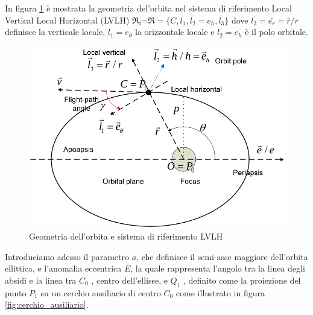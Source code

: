 In figura \ref{fig:LVLH} è mostrata la
geometria del'orbita nel sistema di riferimento Local Vertical Local Horizontal (LVLH)
$\mathfrak{R_l}$=$\mathfrak{R}=\{C,\bar{l_1},\bar{l_2}=e_h,\bar{l_3}\}$ dove
$\bar{l_3}=\bar{e_r}=\bar{r}/r$ definisce la verticale locale, $l_1=e_{\theta}$
la orizzontale locale e $l_2=e_h$ è il polo orbitale.


\begin{figure}[htp]
\begin{center}
  \includegraphics[width=\textwidth]{modelling/orbit_dynamics/image/LVLH.png}
  \caption{Geometria dell'orbita e sistema di riferimento LVLH}
  \label{fig:LVLH}
\end{center}
\end{figure}


Introduciamo adesso il parametro $a$, che definisce il semi-asse maggiore
dell'orbita ellittica, e l'anomalia eccentrica $E$, la quale rappresenta
l'angolo tra la linea degli absidi e la linea tra $C_0$ , centro dell’ellisse, e $Q_1$ ,
definito come la proiezione del punto $P_1$ su un cerchio ausiliario di centro
$C_0$ come illustrato in figura \ref{fig:cerchio_ausiliario}.


